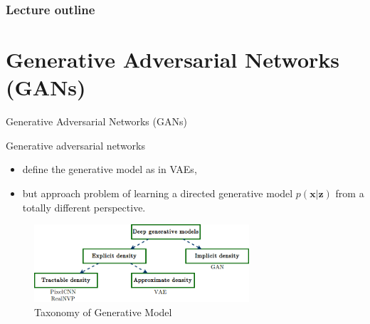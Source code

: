 
 







\begin{frame}
\frametitle{Lecture outline}
\tableofcontents
\end{frame}

\section{Generative Adversarial Networks (GANs)}

\begin{frame} {Generative Adversarial Networks (GANs)}

Generative adversarial networks
\begin{itemize}
\item define the generative model as in VAEs,
\item but approach problem of learning a directed generative model $p(\mathbf{x}| \mathbf{z})$ from a totally different perspective.
\vspace{1mm}
\end{itemize}
\begin{figure}
\includegraphics[width=8cm]{plots/taxonomy.png}
\tiny{\\Taxonomy of Generative Model}
\end{figure}

\end{frame}

